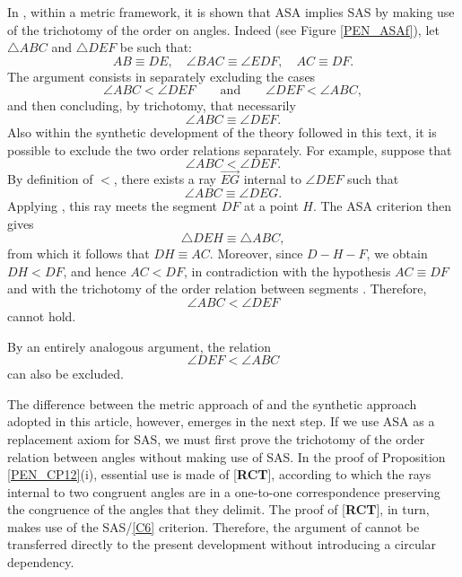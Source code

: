 \documentclass[11pt,a4paper]{article}
\theoremstyle{definition}
\theoremstyle{remark}
\numberwithin{equation}{section}
\begin{document}
In \cite[Theorem 16.5]{Martin1982}, within a metric framework, it is shown that ASA implies SAS by making
use of the trichotomy of the order on angles. Indeed (see Figure \ref{PEN_ASAf}), let $\triangle ABC$ and $\triangle DEF$ be such that:
\begin{equation*}
AB\equiv DE,\quad \angle BAC\equiv \angle EDF,\quad AC\equiv DF.
\end{equation*}
The argument consists in separately excluding the cases
\begin{equation*}
\angle ABC<\angle DEF
\qquad\text{and}\qquad
\angle DEF<\angle ABC,
\end{equation*}
and then concluding, by trichotomy, that necessarily
\begin{equation*}
\angle ABC\equiv\angle DEF.
\end{equation*}
Also within the synthetic development of the theory followed in this text,
it is possible to exclude the two order relations separately. For example, suppose that
\begin{equation*}
\angle ABC<\angle DEF.
\end{equation*}
By definition of $<$, there exists a ray $\overrightarrow{EG}$ internal to $\angle DEF$ such that
\begin{equation*}
\angle ABC\equiv\angle DEG.
\end{equation*}
Applying \cite[Crossbar Theorem, p.~82]{Greenberg1993}, this ray meets the segment $DF$ at a point $H$. The ASA criterion then gives
\begin{equation*}
\triangle DEH\equiv\triangle ABC,
\end{equation*}
from which it follows that $DH\equiv AC$. Moreover, since $D-H-F$, we obtain $DH<DF$, and hence $AC<DF$, in contradiction with the hypothesis $AC\equiv DF$ and with the trichotomy of the order relation between segments \cite[Proposition 3.13]{Greenberg1993}. Therefore,
\begin{equation*}
\angle ABC<\angle DEF
\end{equation*}
cannot hold.

By an entirely analogous argument, the relation
\begin{equation*}
\angle DEF<\angle ABC
\end{equation*}
can also be excluded.

The difference between the metric approach of \cite{Martin1982} and the synthetic approach adopted in this article, however, emerges in the next step. If we use ASA as a replacement axiom for SAS, we must first prove the trichotomy of the order relation between angles without making use of SAS. In the proof of Proposition \ref{PEN_CP12}(i), essential use is made of [\textbf{RCT}], according to which the rays internal to two congruent angles are in a one-to-one correspondence preserving the congruence of the angles that they delimit. The proof of [\textbf{RCT}], in turn, makes use of the SAS/\ref{C6} criterion. Therefore, the argument of \cite{Martin1982} cannot be transferred directly to the present development without introducing a circular dependency.
\end{document}
